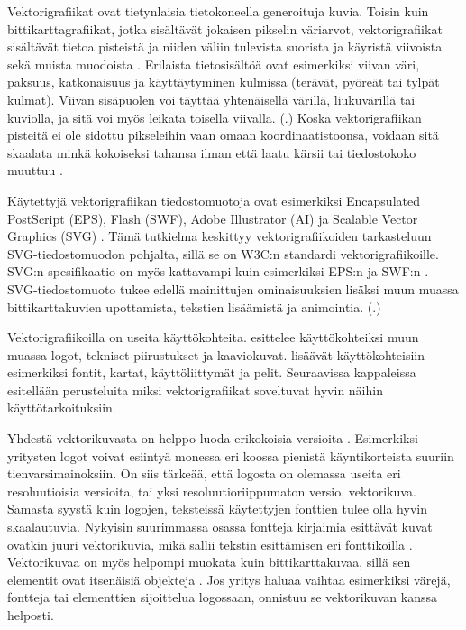 \documentclass[utf8,bachelor]{gradu3}
\newcommand{\parencitedot}[1]{(\cite{#1}.)}
\begin{document}
Vektorigrafiikat ovat tietynlaisia tietokoneella generoituja kuvia. Toisin kuin bittikarttagrafiikat, jotka sisältävät jokaisen pikselin väriarvot, vektorigrafiikat sisältävät tietoa pisteistä ja niiden väliin tulevista suorista ja käyristä viivoista sekä muista muodoista \parencites{RefWorks:doc:5bdc5224e4b05afcfde5b159}{RefWorks:doc:5bdc5292e4b05afcfde5b171}. Erilaista tietosisältöä ovat esimerkiksi viivan väri, paksuus, katkonaisuus ja käyttäytyminen kulmissa (terävät, pyöreät tai tylpät kulmat). Viivan sisäpuolen voi täyttää yhtenäisellä värillä, liukuvärillä tai kuviolla, ja sitä voi myös leikata toisella viivalla. \parencitedot{RefWorks:doc:5bd74719e4b0e42e08f6333b} Koska vektorigrafiikan pisteitä ei ole sidottu pikseleihin vaan omaan koordinaatistoonsa, voidaan sitä skaalata minkä kokoiseksi tahansa ilman että laatu kärsii tai tiedostokoko muuttuu \parencite{RefWorks:doc:5bdc5292e4b05afcfde5b171}.

Käytettyjä vektorigrafiikan tiedostomuotoja ovat esimerkiksi Encapsulated PostScript (EPS), Flash (SWF), Adobe Illustrator (AI) ja Scalable Vector Graphics (SVG) \parencite{RefWorks:doc:5bdc5224e4b05afcfde5b159}. Tämä tutkielma keskittyy vektorigrafiikoiden tarkasteluun SVG-tiedostomuodon pohjalta, sillä se on W3C:n standardi vektorigrafiikoille. SVG:n spesifikaatio on myös kattavampi kuin esimerkiksi EPS:n \parencite{RefWorks:doc:5bdc900de4b0afdabde32fb7} ja SWF:n \parencite{RefWorks:doc:5bdc9306e4b069b454d8459e}. SVG-tiedostomuoto tukee edellä mainittujen ominaisuuksien lisäksi muun muassa bittikarttakuvien upottamista, tekstien lisäämistä ja animointia. \parencitedot{RefWorks:doc:5bd74719e4b0e42e08f6333b}

Vektorigrafiikoilla on useita käyttökohteita. \textcite{RefWorks:doc:5bdc5224e4b05afcfde5b159} esittelee käyttökohteiksi muun muassa logot, tekniset piirustukset ja kaaviokuvat. \textcite{RefWorks:doc:5bdd9b5ae4b0954dddb26329} lisäävät käyttökohteisiin esimerkiksi fontit, kartat, käyttöliittymät ja pelit. Seuraavissa kappaleissa esitellään perusteluita miksi vektorigrafiikat soveltuvat hyvin näihin käyttötarkoituksiin.

Yhdestä vektorikuvasta on helppo luoda erikokoisia versioita \parencite{RefWorks:doc:5bdc5224e4b05afcfde5b159}. Esimerkiksi yritysten logot voivat esiintyä monessa eri koossa pienistä käyntikorteista suuriin tienvarsimainoksiin. On siis tärkeää, että logosta on olemassa useita eri resoluutioisia versioita, tai yksi resoluutioriippumaton versio, vektorikuva. Samasta syystä kuin logojen, teksteissä käytettyjen fonttien tulee olla hyvin skaalautuvia. Nykyisin suurimmassa osassa fontteja kirjaimia esittävät kuvat ovatkin juuri vektorikuvia, mikä sallii tekstin esittämisen eri fonttikoilla \parencite{RefWorks:doc:5bdc5224e4b05afcfde5b159}. Vektorikuvaa on myös helpompi muokata kuin bittikarttakuvaa, sillä sen elementit ovat itsenäisiä objekteja \parencite{RefWorks:doc:5bdc5224e4b05afcfde5b159}. Jos yritys haluaa vaihtaa esimerkiksi värejä, fontteja tai elementtien sijoittelua logossaan, onnistuu se vektorikuvan kanssa helposti.
\end{document}
